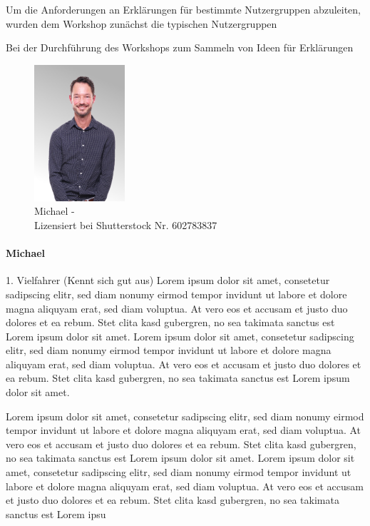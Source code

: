 Um die Anforderungen an Erklärungen für bestimmte Nutzergruppen abzuleiten, wurden dem Workshop zunächst die typischen Nutzergruppen 

Bei der Durchführung des Workshops zum Sammeln von Ideen für Erklärungen 

\begin{figure}
    \vspace{-\intextsep}
    \centering
    \includegraphics[width=0.3\textwidth]{contents/06_model_evaluation/01_integration/res/persona_picture_michael.png}
    \caption{Michael -\\Lizensiert bei Shutterstock Nr. 602783837}
\end{figure}

\paragraph{Michael} 1. Vielfahrer (Kennt sich gut aus) Lorem ipsum dolor sit amet, consetetur sadipscing elitr, sed diam nonumy eirmod tempor invidunt ut labore et dolore magna aliquyam erat, sed diam voluptua. At vero eos et accusam et justo duo dolores et ea rebum. Stet clita kasd gubergren, no sea takimata sanctus est Lorem ipsum dolor sit amet. Lorem ipsum dolor sit amet, consetetur sadipscing elitr, sed diam nonumy eirmod tempor invidunt ut labore et dolore magna aliquyam erat, sed diam voluptua. At vero eos et accusam et justo duo dolores et ea rebum. Stet clita kasd gubergren, no sea takimata sanctus est Lorem ipsum dolor sit amet.

Lorem ipsum dolor sit amet, consetetur sadipscing elitr, sed diam nonumy eirmod tempor invidunt ut labore et dolore magna aliquyam erat, sed diam voluptua. At vero eos et accusam et justo duo dolores et ea rebum. Stet clita kasd gubergren, no sea takimata sanctus est Lorem ipsum dolor sit amet. Lorem ipsum dolor sit amet, consetetur sadipscing elitr, sed diam nonumy eirmod tempor invidunt ut labore et dolore magna aliquyam erat, sed diam voluptua. At vero eos et accusam et justo duo dolores et ea rebum. Stet clita kasd gubergren, no sea takimata sanctus est Lorem ipsu

